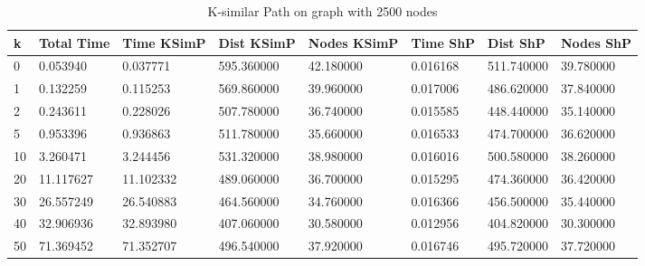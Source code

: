 \documentclass[]{article}
\numberwithin{equation}{section}
\begin{document}
\begin{appendices}
\begin{table}[H]
	\centering
	\small
	\setlength\tabcolsep{2pt}
	\begin{tabular}{|l|l|l|l|l|l|l|l|}
		\hline
		k  & Total Time & Time KSimP & Dist KSimP & Nodes KSimP & Time ShP & Dist ShP   & Nodes ShP \\ \hline
		0  & 0.053940   & 0.037771   & 595.360000 & 42.180000   & 0.016168 & 511.740000 & 39.780000 \\ \hline
		1  & 0.132259   & 0.115253   & 569.860000 & 39.960000   & 0.017006 & 486.620000 & 37.840000 \\ \hline
		2  & 0.243611   & 0.228026   & 507.780000 & 36.740000   & 0.015585 & 448.440000 & 35.140000 \\ \hline
		5  & 0.953396   & 0.936863   & 511.780000 & 35.660000   & 0.016533 & 474.700000 & 36.620000 \\ \hline
		10 & 3.260471   & 3.244456   & 531.320000 & 38.980000   & 0.016016 & 500.580000 & 38.260000 \\ \hline
		20 & 11.117627  & 11.102332  & 489.060000 & 36.700000   & 0.015295 & 474.360000 & 36.420000 \\ \hline
		30 & 26.557249  & 26.540883  & 464.560000 & 34.760000   & 0.016366 & 456.500000 & 35.440000 \\ \hline
		40 & 32.906936  & 32.893980  & 407.060000 & 30.580000   & 0.012956 & 404.820000 & 30.300000 \\ \hline
		50 & 71.369452  & 71.352707  & 496.540000 & 37.920000   & 0.016746 & 495.720000 & 37.720000 \\ \hline
	\end{tabular}
	\caption{K-similar Path on graph with 2500 nodes}
\end{table}


\end{appendices}
\end{document}
